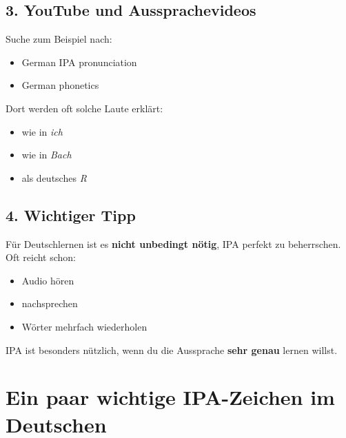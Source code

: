 \documentclass[a4paper]{article}
\newcommand{\ipa}[1]{{\ipafont[#1]}}
\begin{document}
        \subsection{3. YouTube und Aussprachevideos}
            Suche zum Beispiel nach:
            \begin{itemize}[leftmargin=1.5cm]
        \item German IPA pronunciation
        \item German phonetics
            \end{itemize}
            
            Dort werden oft solche Laute erklärt:
            \begin{itemize}[leftmargin=1.5cm]
        \item \ipa{ç} wie in \textit{ich}
        \item \ipa{x} wie in \textit{Bach}
        \item \ipa{ʁ} als deutsches \textit{R}
            \end{itemize}
        
        \subsection{4. Wichtiger Tipp}
            Für Deutschlernen ist es \textbf{nicht unbedingt nötig}, IPA perfekt zu beherrschen.\\
            Oft reicht schon:
            \begin{itemize}[leftmargin=1.5cm]
        \item Audio hören
        \item nachsprechen
        \item Wörter mehrfach wiederholen
            \end{itemize}
            
            IPA ist besonders nützlich, wenn du die Aussprache \textbf{sehr genau} lernen willst.
    
    
    \section{Ein paar wichtige IPA-Zeichen im Deutschen}
        
\end{document}
